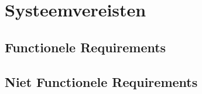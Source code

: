 \chapter{Systeemvereisten}

\section{Functionele Requirements}







%

\section{Niet Functionele Requirements}

